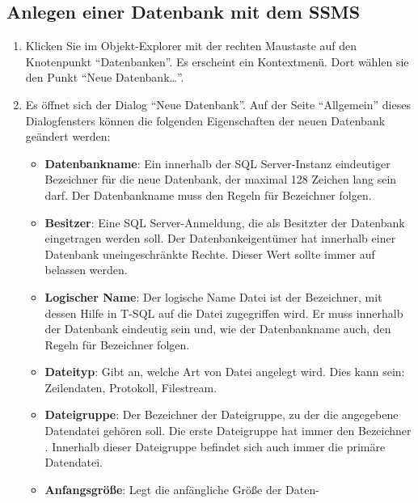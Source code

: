       \subsection{Anlegen einer Datenbank mit dem SSMS}
        \begin{enumerate}
          \item Klicken Sie im Objekt-Explorer mit der rechten Maustaste
          auf den Knotenpunkt \enquote{Datenbanken}. Es erscheint ein
          Kontextmenü. Dort wählen sie den Punkt \enquote{Neue
          Datenbank\ldots}.
          \item Es öffnet sich der Dialog \enquote{Neue Datenbank}.
          Auf der Seite \enquote{Allgemein} dieses Dialogfensters können die
          folgenden Eigenschaften der neuen Datenbank geändert werden:
          \begin{itemize}
            \item \textbf{Datenbankname}: Ein innerhalb der SQL Server-Instanz
            eindeutiger Bezeichner f\"ur die neue Datenbank, der maximal 128
            Zeichen lang sein darf. Der Datenbankname muss den Regeln f\"ur
            Bezeichner folgen.
            \item \textbf{Besitzer}: Eine SQL Server-Anmeldung, die als
            Besitzter der Datenbank eingetragen werden soll. Der
            Datenbankeigentümer hat innerhalb einer Datenbank uneingeschränkte
            Rechte. Dieser Wert sollte immer auf 
            belassen werden.
            \item \textbf{Logischer Name}: Der logische Name Datei ist der
            Bezeichner, mit dessen Hilfe in T-SQL auf die Datei zugegriffen
            wird. Er muss innerhalb der Datenbank eindeutig sein und, wie der
            Datenbankname auch, den Regeln f\"ur Bezeichner folgen.
            \item \textbf{Dateityp}: Gibt an, welche Art von Datei angelegt
            wird. Dies kann sein: Zeilendaten, Protokoll, Filestream.
            \item \textbf{Dateigruppe}: Der Bezeichner der Dateigruppe, zu der
            die angegebene Datendatei gehören soll. Die erste Dateigruppe hat
            immer den Bezeichner . Innerhalb dieser
            Dateigruppe befindet sich auch immer die primäre Datendatei.
            \item \textbf{Anfangsgröße}: Legt die anfängliche Größe der Daten-

\end{itemize}
\end{enumerate}
